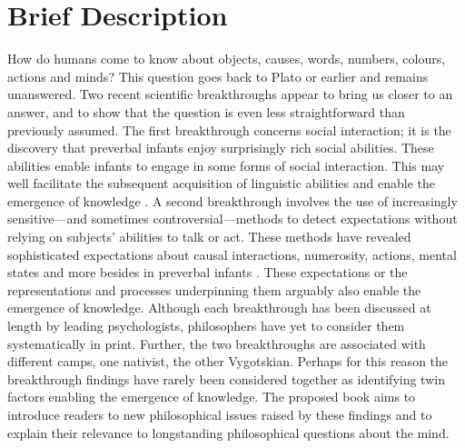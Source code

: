\documentclass[12pt,\papersize]{extarticle}
\date{}
\begin{document}
\setlength\footnotesep{1em}





\maketitle

\setcounter{secnumdepth}{-1} 



\section{Brief Description}
How do humans come to know about %
objects,
causes,
words,
numbers,
colours,
actions
and
minds? 
This question goes back to Plato or earlier and remains unanswered.
Two recent scientific breakthroughs appear to bring us closer to an answer, and to show that the question is even less straightforward than previously  assumed.
The first breakthrough concerns social interaction;
it is the discovery that preverbal infants enjoy surprisingly rich social abilities.
These abilities enable infants to engage in some forms of social interaction. 
This may well facilitate the subsequent acquisition of linguistic abilities and enable the emergence of knowledge \citep[e.g.][]{Csibra:2009xr,Meltzoff:2007pj,Tomasello:2005wx}. 
A second breakthrough involves the use of increasingly sensitive---and sometimes controversial---methods to detect  expectations without relying on subjects' abilities to talk or act.  
These methods have revealed sophisticated expectations about  causal interactions, numerosity, actions, mental states and more besides in preverbal infants \citep[e.g.][]{Spelke:1990jn,Baillargeon:gx}.
These expectations or the representations and processes underpinning them arguably also enable the emergence of knowledge. 
Although each breakthrough has been discussed at length by leading psychologists, philosophers have yet to consider them systematically in print.
Further, the two breakthroughs are associated with different camps, one nativist, the other Vygotskian.
Perhaps for this reason the breakthrough findings have rarely been considered together as identifying twin factors enabling the emergence of knowledge.
The proposed book aims to introduce readers to  
new philosophical issues raised by these findings  
and to explain their relevance to longstanding philosophical questions about the mind.  
\end{document}
